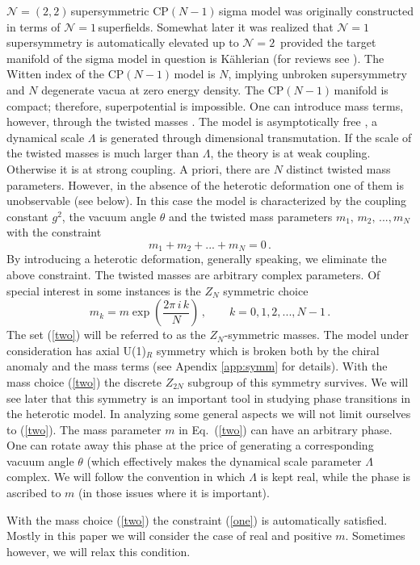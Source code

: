\documentclass[epsfig,12pt]{article}
\def\beq{\begin{equation}}
\def\eeq{\end{equation}}
\newcommand{\ntwo}{${\mathcal N}=2\,$}
\newcommand{\none}{${\mathcal N}=1\,$}
\newcommand{\ntt}{${\mathcal N}=(2,2)\,$}
\newcommand{\cpn}{CP$(N-1)\,$}
\def\beq{\begin{equation}}
\def\eeq{\end{equation}}
\begin{document}
\ntt supersymmetric \cpn sigma model was originally constructed 
\cite{orco}
in terms of \none superfields. Somewhat later it was realized \cite{Bruno}
that 
\none supersymmetry is automatically elevated up to \ntwo
provided the target manifold of the sigma model in question is K\"ahlerian (for reviews see \cite{rev1,rev2}).
The Witten index \cite{WI} of the \cpn model is $N$, implying unbroken supersymmetry
and $N$ degenerate vacua at zero energy density.
The \cpn manifold is compact; therefore, superpotential is impossible.
One can introduce mass terms, however, through the twisted masses \cite{twisted}.
The model is asymptotically free \cite{BelPo}, a dynamical scale $\Lambda$ is generated through dimensional transmutation. If the scale of the twisted masses is much larger than $\Lambda$, the theory is at weak coupling.
Otherwise it is at strong coupling. A priori, there are $N$ distinct twisted mass parameters.
However, in the absence of the heterotic deformation one of them is unobservable
(see below). In this case the model is characterized by the coupling constant $g^2$,
the vacuum angle $\theta$ and the twisted mass parameters $m_1,\,m_2,\, ..., m_N$
with the constraint
\beq
m_1 + m_2 + ... +m_N =0\,.
\label{one}
\eeq
By introducing a heterotic deformation, generally speaking, we eliminate the above constraint.
The twisted masses are arbitrary complex parameters. Of special interest 
in some instances 
is the $Z_N$ symmetric choice
\beq
m_k = m\exp\left(\frac{2\pi \,i\, k}{N}\right)\,,\qquad k = 0,1,2, ... ,N-1\,.
\label{two}
\eeq
The set (\ref{two}) will be referred to as the $Z_N$-symmetric masses. The model 
under consideration has axial U(1)$_R$ symmetry which is broken both by the chiral anomaly
and the mass terms (see Apendix \ref{app:symm} for details). 
With the mass choice (\ref{two}) the discrete
$Z_{2N}$ subgroup of this symmetry survives. We will see later that this symmetry is an
important tool in studying phase transitions in the heterotic model. In analyzing some general aspects
we will not limit ourselves to (\ref{two}). The mass parameter $m$ in Eq.~(\ref{two})
can have an arbitrary phase. One can rotate away this phase at the price of generating a 
corresponding vacuum angle $\theta$ (which effectively makes the dynamical scale parameter $\Lambda$
complex. We will follow the convention in which $\Lambda$ is kept real, while the   phase
is ascribed to $m$ (in those issues where it is important).

With the mass choice (\ref{two}) the constraint
(\ref{one}) is automatically satisfied. Mostly in this paper we will consider the case
of real and positive $m$. Sometimes however, we will relax this condition.
\end{document}
